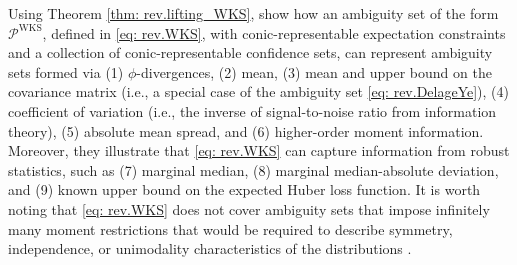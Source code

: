 \documentclass[final,onefignum,onetabnum]{class}
\newcommand{\Cs}[1]{\mathcal{#1}} %
\begin{document}
Using Theorem \ref{thm: rev.lifting_WKS}, \citet{wiesemann2014} show how an ambiguity set of the form $\Cs{P}^{\text{WKS}}$, defined in \eqref{eq: rev.WKS}, with conic-representable expectation constraints and a collection of conic-representable confidence sets, can represent ambiguity sets formed via (1) $\phi$-divergences, (2) mean, (3) mean and upper bound on the covariance matrix (i.e., a special case of the ambiguity set \eqref{eq: rev.DelageYe}), (4) coefficient of variation (i.e., the inverse of signal-to-noise ratio from information theory), (5) absolute mean spread, and (6) higher-order moment information.  Moreover, they illustrate that \eqref{eq: rev.WKS} can capture information from robust statistics, such as (7) marginal median, (8) marginal median-absolute deviation, and (9) known upper bound on the expected Huber loss function. 
It is worth noting that \eqref{eq: rev.WKS} does not cover ambiguity
sets that impose infinitely many moment restrictions that
would be required to describe symmetry, independence, or
unimodality characteristics of the distributions \citep{chen2018infinite}. 
\end{document}
